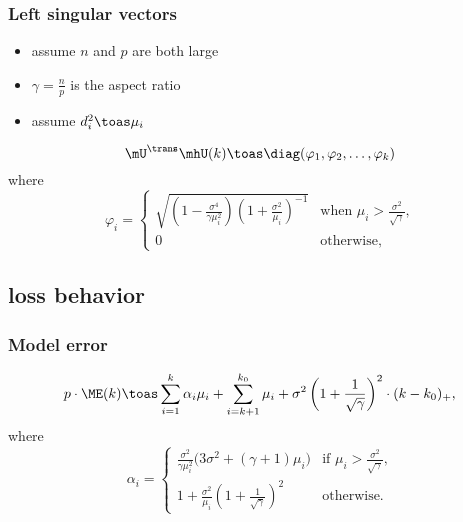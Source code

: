 \documentclass{beamer}
\begin{document}
\begin{frame} 
  \frametitle{Left singular vectors}
  \begin{itemize}
  \item assume $n$ and $p$ are both large
  \item $\gamma = \frac{n}{p}$ is the aspect ratio
  \item assume $d_i^2 \toas \mu_i$
  \end{itemize}
  \begin{theorem}
    \[
      \mU^\trans \mhU(k)
      \toas
      \diag(\varphi_1, \varphi_2, \ldots, \varphi_k)
    \]
    where
    \[
      \varphi_i =
        \begin{cases}
            \sqrt{
                \left( 1 - \frac{\sigma^4}{ \gamma \mu_i^2} \right)
                \left( 1 + \frac{\sigma^2}{ \mu_i  } \right)^{-1} }
            &\text{when $\mu_i > \frac{\sigma^2}{\sqrt{\gamma}}$,} \\
            0
            &\text{otherwise,}
        \end{cases}
    \]
  \end{theorem}
\end{frame}

\subsection{loss behavior}

\begin{frame}
  \frametitle{Model error}
  \begin{theorem}
\begin{equation*}
    p \cdot {\ME} (k)
        \toas
        \sum_{i=1}^{k}
            \alpha_i \mu_i
        +
        \sum_{i=k+1}^{k_0}
            \mu_i
        +
        \sigma^2
        \left(
            1 + \frac{1}{\sqrt{\gamma}}
        \right)^2
        \cdot
        (k - k_0)_+,
\end{equation*}
where
\begin{equation*}
    \alpha_i 
    =
    \begin{cases}
        \frac{\sigma^2}{\gamma \mu_i^2}
                \big(
                    3 \sigma^2 + (\gamma+1) \mu_i
                \big)
            &\text{if $\mu_i > \frac{\sigma^2}{\sqrt{\gamma}}$,} \\
        1 
        + 
        \frac{\sigma^2}{\mu_i}
        \left(
            1
            +
            \frac{1}{\sqrt{\gamma}}
        \right)^2
            &\text{otherwise.}
    \end{cases}
\end{equation*}
\end{theorem}
\end{frame}
\end{document}
